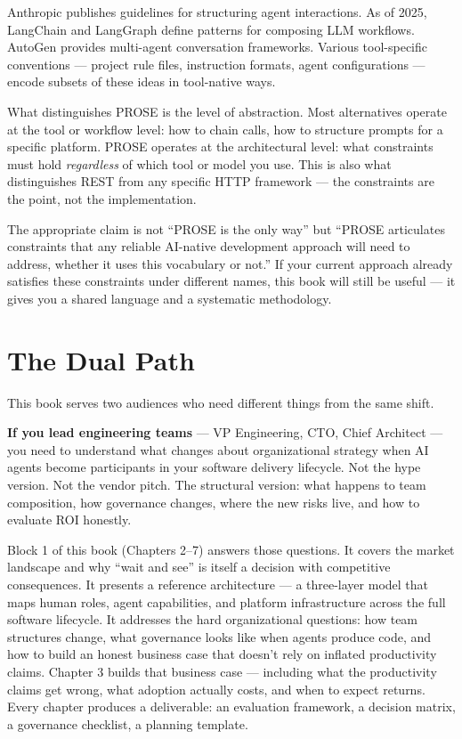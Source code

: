 \documentclass[
  a4paper,
  DIV=11,
  numbers=noendperiod]{scrreprt}
\begin{document}
Anthropic publishes guidelines for structuring agent interactions. As of
2025, LangChain and LangGraph define patterns for composing LLM
workflows. AutoGen provides multi-agent conversation frameworks. Various
tool-specific conventions --- project rule files, instruction formats,
agent configurations --- encode subsets of these ideas in tool-native
ways.

What distinguishes PROSE is the level of abstraction. Most alternatives
operate at the tool or workflow level: how to chain calls, how to
structure prompts for a specific platform. PROSE operates at the
architectural level: what constraints must hold \emph{regardless} of
which tool or model you use. This is also what distinguishes REST from
any specific HTTP framework --- the constraints are the point, not the
implementation.

The appropriate claim is not ``PROSE is the only way'' but ``PROSE
articulates constraints that any reliable AI-native development approach
will need to address, whether it uses this vocabulary or not.'' If your
current approach already satisfies these constraints under different
names, this book will still be useful --- it gives you a shared language
and a systematic methodology.

\section{The Dual Path}\label{the-dual-path}

This book serves two audiences who need different things from the same
shift.

\textbf{If you lead engineering teams} --- VP Engineering, CTO, Chief
Architect --- you need to understand what changes about organizational
strategy when AI agents become participants in your software delivery
lifecycle. Not the hype version. Not the vendor pitch. The structural
version: what happens to team composition, how governance changes, where
the new risks live, and how to evaluate ROI honestly.

Block 1 of this book (Chapters 2--7) answers those questions. It covers
the market landscape and why ``wait and see'' is itself a decision with
competitive consequences. It presents a reference architecture --- a
three-layer model that maps human roles, agent capabilities, and
platform infrastructure across the full software lifecycle. It addresses
the hard organizational questions: how team structures change, what
governance looks like when agents produce code, and how to build an
honest business case that doesn't rely on inflated productivity claims.
Chapter 3 builds that business case --- including what the productivity
claims get wrong, what adoption actually costs, and when to expect
returns. Every chapter produces a deliverable: an evaluation framework,
a decision matrix, a governance checklist, a planning template.
\end{document}
